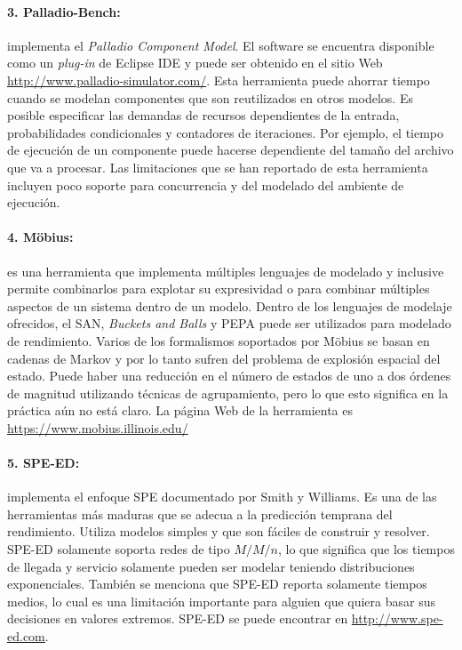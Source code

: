\documentclass[11pt, twoside]{report}
\begin{document}
\paragraph{3. Palladio-Bench:} implementa el \emph{Palladio Component Model}. El software se encuentra disponible como un \emph{plug-in} de Eclipse IDE y puede ser obtenido en el sitio Web \url{http://www.palladio-simulator.com/}. Esta herramienta puede ahorrar tiempo cuando se modelan componentes que son reutilizados en otros modelos. Es posible especificar las demandas de recursos dependientes de la entrada, probabilidades condicionales y contadores de iteraciones. Por ejemplo, el tiempo de ejecución de un componente puede hacerse dependiente del tamaño del archivo que va a procesar. Las limitaciones que se han reportado de esta herramienta incluyen poco soporte para concurrencia y del modelado del ambiente de ejecución. 

\paragraph{4. Möbius:} es una herramienta que implementa múltiples lenguajes de modelado y inclusive permite combinarlos para explotar su expresividad o para combinar múltiples aspectos de un sistema dentro de un modelo. Dentro de los lenguajes de modelaje ofrecidos, el SAN, \emph{Buckets and Balls} y PEPA puede ser utilizados para modelado de rendimiento. Varios de los formalismos soportados por Möbius se basan en cadenas de Markov y por lo tanto sufren del problema de explosión espacial del estado. Puede haber una reducción en el número de estados de uno a dos órdenes de magnitud utilizando técnicas de agrupamiento, pero lo que esto significa en la práctica aún no está claro. La página Web de la herramienta es \url{https://www.mobius.illinois.edu/}

\paragraph{5. SPE-ED:} implementa el enfoque SPE documentado por Smith y Williams\cite{spe-ed}. Es una de las herramientas más maduras que se adecua a la predicción temprana del rendimiento. Utiliza modelos simples y que son fáciles de construir y resolver. SPE-ED solamente soporta redes de tipo $M/M/n$, lo que significa que los tiempos de llegada y servicio solamente pueden ser modelar teniendo distribuciones exponenciales. También se menciona que SPE-ED reporta solamente tiempos medios, lo cual es una limitación importante para alguien que quiera basar sus decisiones en valores extremos. SPE-ED se puede encontrar en \url{http://www.spe-ed.com}.
\end{document}

